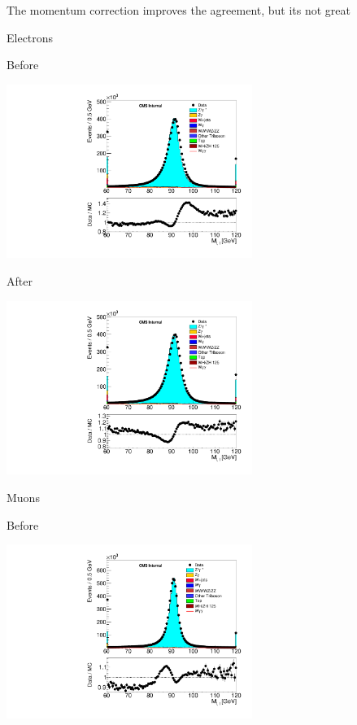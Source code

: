 \documentclass{beamer}
\begin{document}
 {

    \scriptsize

    The momentum correction improves the agreement, but its not great

    \bc
        Electrons
   
        Before

        \includegraphics[width=0.6\textwidth]{Plots/m_leplep_ee_zMassZoom_NoCorr.pdf}

        After
           
        \includegraphics[width=0.6\textwidth]{Plots/m_leplep_ee_zMassZoom.pdf}

        Muons

        Before

        \includegraphics[width=0.6\textwidth]{Plots/m_leplep_mm_zMassZoom_NoCorr.pdf}

}
\end{document}
